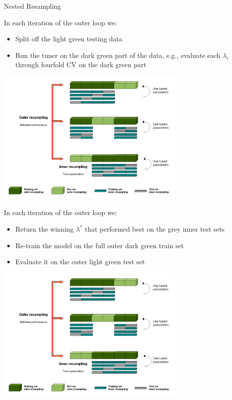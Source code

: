 \begin{vbframe}{Nested Resampling}
\framebreak

\begin{footnotesize}
In each iteration of the outer loop we:
\begin{itemize}
\item Split off the light green testing data
\item Run the tuner on the dark green part of the data, e.g.,
  evaluate each $\lambda_i$ through fourfold CV on the dark green part
\end{itemize}
\end{footnotesize}

\begin{center}\includegraphics[width = 0.7\textwidth]{figure_man/Nested_Resampling.png}\end{center}

\framebreak

\begin{footnotesize}
In each iteration of the outer loop we:
\begin{itemize}
\item Return the winning $\lambda^*$ that performed best on the grey inner test sets
\item Re-train the model on the full outer dark green train set
\item Evaluate it on the outer light green test set
\end{itemize}
\end{footnotesize}

\begin{center}\includegraphics[width = 0.7\textwidth]{figure_man/Nested_Resampling.png}\end{center}


\end{vbframe}

